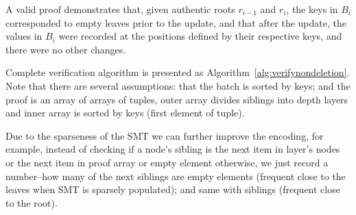\documentclass[twocolumn]{article}
\begin{document}
A valid proof demonstrates that, given authentic roots $r_{i-1}$ and $r_i$, the keys in $B_i$ corresponded to empty leaves prior to the update, and that after the update, the values in $B_i$ were recorded at the positions defined by their respective keys, and there were no other changes.

Complete verification algorithm is presented as Algorithm~\ref{alg:verifynondeletion}. Note that there are several assumptions: that the batch is sorted by keys; and the proof is an array of arrays of tuples, outer array divides siblings into depth layers and inner array is sorted by keys (first element of tuple).

Due to the sparseness of the SMT we can further improve the encoding, for example, instead of checking if a node's sibling is the next item in layer's nodes or the next item in proof array or empty element otherwise, we just record a number--how many of the next siblings are empty elements (frequent close to the leaves when SMT is sparsely populated); and same with siblings (frequent close to the root).
\end{document}
